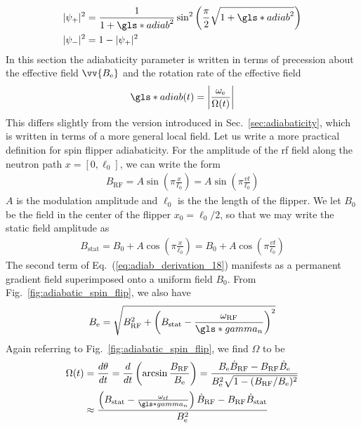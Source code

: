 %
\begin{align}
    |\psi_{+}|^{2} &= \frac{1}{1+\gls*{adiab}^{2}}\sin^{2}\left(\frac{\pi}{2}\sqrt{1+\gls*{adiab}^{2}}\right) \\
    |\psi_{-}|^{2} &= 1-|\psi_{+}|^{2} \label{eq:adiab_derivation_16}
\end{align}
%
In this section the adiabaticity parameter is written in terms of precession about the effective field $\vv{B_\text{e}}$ and the rotation rate of the effective field 
%
\begin{gather}
    \gls*{adiab}(t)=\left|\frac{\omega_\text{e}}{\Omega(t)}\right| \label{eq:adiab_AFP}
\end{gather}
%
This differs slightly from the version introduced in Sec.~\ref{sec:adiabaticity}, which is written in terms of a more general local field. Let us write a more practical definition for spin flipper adiabaticity. For the amplitude of the \acrshort*{rf} field along the neutron path $x=[0,\ell_0]$, we can write the form \cite{grigoriev_neutron_2001}
%
\begin{gather}
    B_\text{RF}=A\sin \left(\pi \frac{x}{\ell_0}\right) = A\sin \left(\pi \frac{vt}{\ell_0}\right)\label{eq:adiab_derivation_17}
\end{gather}
%
$A$ is the modulation amplitude and $\ell_0$ is the the length of the flipper. We let $B_0$ be the field in the center of the flipper $x_0=\ell_0/2$, so that we may write the static field amplitude as
%
\begin{gather}
    B_\text{stat}=B_0 + A\cos\left(\pi \frac{x}{\ell_0}\right) =B_0 + A\cos\left(\pi \frac{vt}{\ell_0}\right)\label{eq:adiab_derivation_18}
\end{gather}
%
The second term of Eq.~(\ref{eq:adiab_derivation_18}) manifests as a permanent gradient field superimposed onto a uniform field $B_0$. From Fig.~\ref{fig:adiabatic_spin_flip}, we also have
%
\begin{gather}
    B_\text{e}=\sqrt{B_\text{RF}^2+\left(B_\text{stat}-\frac{\omega_\text{RF}}{\gls*{gamma_n}} \right)^2}
\end{gather}
%
Again referring to Fig.~\ref{fig:adiabatic_spin_flip}, we find $\Omega$ to be
%
\begin{align}
    \Omega(t) &= \frac{d\theta}{dt}= \frac{d}{dt}\left( \arcsin \frac{B_\text{RF}}{B_\text{e}} \right) = 
    \frac{B_\text{e}\dot{B}_\text{RF}-B_\text{RF}\dot{B}_\text{e}}
    {B_\text{e}^2\sqrt{1-(B_\text{RF}/B_\text{e})^2}} \\
    &\approx \frac{\left(B_\text{stat}-\frac{\omega_\text{rf}}{\gls*{gamma_n}} \right)\dot{B}_\text{RF}-B_\text{RF}\dot{B}_\text{stat}}
    {B_\text{e}^2}
     \label{eq:adiab_derivation_19}
\end{align}
